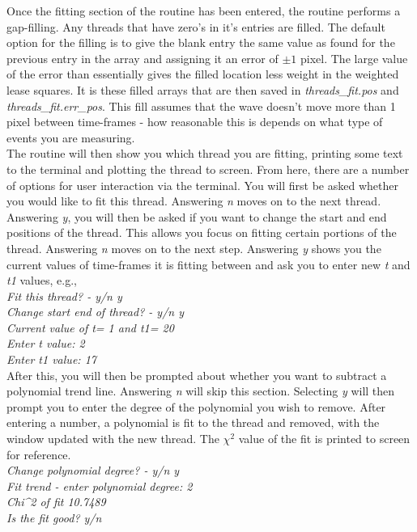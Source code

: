\documentclass{article}
\begin{document}
Once the fitting section of the routine has been entered, the routine performs a gap-filling. Any threads that have zero's in it's entries are filled. The default option for the 
filling is to give the blank entry the same value as found for the previous entry in the array and assigning it an error of $\pm1$ pixel. The large value of the error than 
essentially gives the filled location less weight in the weighted lease squares. It is these filled arrays that are then saved in \textit{threads\_fit.pos} and 
\textit{threads\_fit.err\_pos}. This fill assumes that the wave doesn't move more than 1 pixel between time-frames - how reasonable this is depends on what type of events 
you are measuring.\\

The routine will then show you which thread you are fitting, printing some text to the terminal and plotting the thread to screen. From here, there are a number of options 
for user interaction via the terminal. You will first be asked whether you would like to fit this thread. Answering \textit{n} moves on to the next thread.  Answering \textit{y},
you will then be asked if you want to change the start and end positions of the thread. This allows you focus on fitting certain portions of the thread. Answering \textit{n} moves on to the next step. Answering \textit{y} shows you the current values of time-frames it is fitting between and ask you to enter new \textit{t} and \textit{t1} values, e.g., \\

\textit{Fit this thread? - y/n y\\
Change start end of thread? - y/n y\\
Current value of t=           1 and t1=          20\\
Enter t value: 2\\
Enter t1 value: 17 }\\
 
After this, you will then be prompted about whether you want to subtract a polynomial trend line. Answering \textit{n} will skip this section. Selecting \textit{y} will then 
prompt you to enter the degree of the polynomial you wish to remove. After entering a number, a polynomial is fit to the thread and removed, with the window updated with 
the new thread. The $\chi^2$ value of the fit is printed to screen for reference.\\
 
\textit{Change polynomial degree? - y/n y\\
Fit trend - enter polynomial degree: 2\\
Chi\^{}2 of fit       10.7489\\
Is the fit good? y/n \\}
\end{document}
